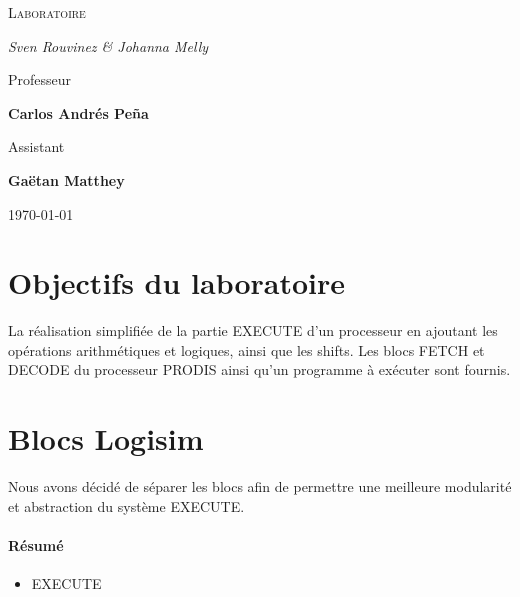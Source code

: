 \documentclass[a4paper]{article} %
\begin{document}
\renewcommand{\labelitemi}{$\bullet$}
\renewcommand{\labelitemii}{$\cdot$}
\renewcommand{\labelitemiii}{$\diamond$}
\renewcommand{\labelitemiv}{$\ast$}

\begin{titlepage}
	\centering
	
	{\scshape\LARGE \color{Monokaimagenta} Laboratoire \\  \par}
	
	\vspace{1cm}
	
	{\Large\itshape Sven Rouvinez \& Johanna Melly\par}
	
	\vfill
	Professeur\par
	\textbf{Carlos Andrés Peña} \par%
	\vspace{1cm}
	Assistant\par
	\textbf{Gaëtan Matthey}
	
	\vfill

	{\large \today\par}
	
\end{titlepage}

\section{Objectifs du laboratoire}
La réalisation simplifiée de la partie EXECUTE d'un processeur en ajoutant les opérations arithmétiques et logiques, ainsi que les shifts. Les blocs FETCH et DECODE du processeur PRODIS ainsi qu'un programme à exécuter sont fournis.

\section{Blocs Logisim}
Nous avons décidé de séparer les blocs afin de permettre une meilleure modularité et abstraction du système EXECUTE.\\
\paragraph{Résumé}
\begin{itemize}
    \item     EXECUTE
\end{itemize}
\end{document}
